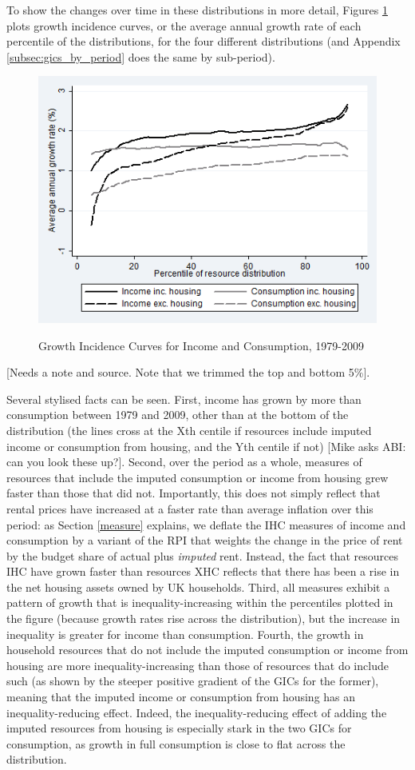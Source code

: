 To show the changes over time in these distributions in more detail, Figures \ref{fig:gicall} plots growth incidence curves, or the average annual growth rate of each percentile of the distributions, for the four different distributions (and Appendix \ref{subsec:gics_by_period} does the same by sub-period).

\begin{figure}
\caption{Growth Incidence Curves for Income and Consumption, 1979-2009}
\centering
\includegraphics[width=.8\linewidth]{pictures/gic_7.png}
\label{fig:gicall}
\end{figure}

[Needs a note and source. Note that we trimmed the top and bottom 5\%].

Several stylised facts can be seen. First, income has grown by more than consumption between 1979 and 2009, other than at the bottom of the distribution (the lines cross at the Xth centile if resources include imputed income or consumption from housing, and the Yth centile if not) [Mike asks ABI: can you look these up?]. Second, over the period as a whole, measures of resources that include the imputed consumption or income from housing grew faster than those that did not. Importantly, this does not simply reflect that rental prices have increased at a faster rate than average inflation over this period: as Section \ref{measure} explains, we deflate the IHC measures of income and consumption by a variant of the RPI that weights the change in the price of rent by the budget share of actual plus \emph{imputed} rent. Instead, the fact that resources IHC have grown faster than resources XHC reflects that there has been a rise in the net housing assets owned by UK households. Third, all measures exhibit a pattern of growth that is inequality-increasing within the percentiles plotted in the figure (because growth rates rise across the distribution), but the increase in inequality is greater for income than consumption. Fourth, the growth in household resources that do not include the imputed consumption or income from housing are more inequality-increasing than those of resources that do include such (as shown by the steeper positive gradient of the GICs for the former), meaning that the imputed income or consumption from housing has an inequality-reducing effect. Indeed, the inequality-reducing effect of adding the imputed resources from housing is especially stark in the two GICs for consumption, as growth in full consumption is close to flat across the distribution.


